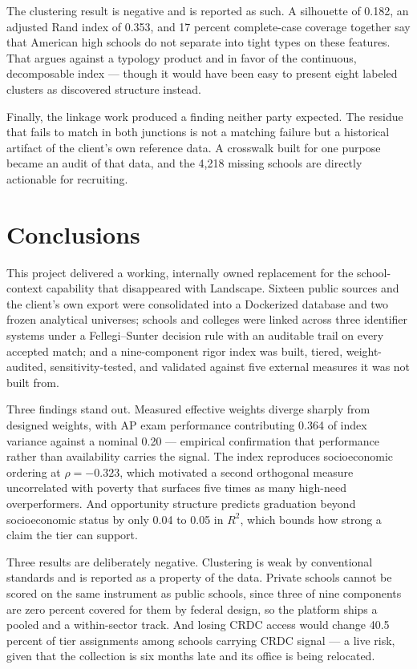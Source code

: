 \documentclass[12pt]{article}
\begin{document}
The clustering result is negative and is reported as such. A silhouette of 0.182, an adjusted Rand index of 0.353, and 17 percent complete-case coverage together say that American high schools do not separate into tight types on these features. That argues against a typology product and in favor of the continuous, decomposable index --- though it would have been easy to present eight labeled clusters as discovered structure instead.

Finally, the linkage work produced a finding neither party expected. The residue that fails to match in both junctions is not a matching failure but a historical artifact of the client's own reference data. A crosswalk built for one purpose became an audit of that data, and the 4{,}218 missing schools are directly actionable for recruiting.

\section{Conclusions}
\label{sec:conclusion}

This project delivered a working, internally owned replacement for the school-context capability that disappeared with Landscape. Sixteen public sources and the client's own export were consolidated into a Dockerized database and two frozen analytical universes; schools and colleges were linked across three identifier systems under a Fellegi--Sunter decision rule with an auditable trail on every accepted match; and a nine-component rigor index was built, tiered, weight-audited, sensitivity-tested, and validated against five external measures it was not built from.

Three findings stand out. Measured effective weights diverge sharply from designed weights, with AP exam performance contributing 0.364 of index variance against a nominal 0.20 --- empirical confirmation that performance rather than availability carries the signal. The index reproduces socioeconomic ordering at $\rho = -0.323$, which motivated a second orthogonal measure uncorrelated with poverty that surfaces five times as many high-need overperformers. And opportunity structure predicts graduation beyond socioeconomic status by only 0.04 to 0.05 in $R^2$, which bounds how strong a claim the tier can support.

Three results are deliberately negative. Clustering is weak by conventional standards and is reported as a property of the data. Private schools cannot be scored on the same instrument as public schools, since three of nine components are zero percent covered for them by federal design, so the platform ships a pooled and a within-sector track. And losing CRDC access would change 40.5 percent of tier assignments among schools carrying CRDC signal --- a live risk, given that the collection is six months late and its office is being relocated.
\end{document}
